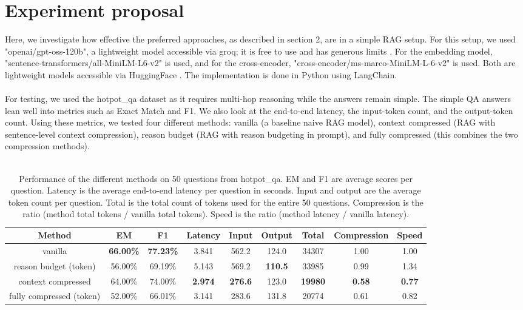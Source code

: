 \documentclass[pdflatex,sn-mathphys-num,oneside]{sn-jnl}%
\theoremstyle{thmstyleone}%
\theoremstyle{thmstyletwo}%
\theoremstyle{thmstylethree}%
\begin{document}
\section{Experiment proposal}\label{sec3}
Here, we investigate how effective the preferred approaches, as described in section 2, are in a simple RAG setup. 
For this setup, we used "openai/gpt-oss-120b", a lightweight model accessible via groq; it is free to use and has generous limits \cite{groq}. 
For the embedding model, "sentence-transformers/all-MiniLM-L6-v2" is used, and for the cross-encoder, "cross-encoder/ms-marco-MiniLM-L-6-v2" is used.
Both are lightweight models accessible via HuggingFace \cite{embedding} \cite{crossencoder}. The implementation is done in Python using LangChain.
\\ \\
For testing, we used the hotpot\_qa dataset as it requires multi-hop reasoning while the answers remain simple. 
The simple QA answers lean well into metrics such as Exact Match and F1.
We also look at the end-to-end latency, the input-token count, and the output-token count.
Using these metrics, we tested four different methods: vanilla (a baseline naive RAG model), context compressed (RAG with sentence-level context compression), reason budget (RAG with reason budgeting in prompt), and fully compressed (this combines the two compression methods).
\\ \\
\FloatBarrier

\begin{table}[htpb]
    \centering
    \begin{tabular}{||c || c | c | c | c|  c|  c|  c| c||}
        \hline 
        Method & EM & F1 & Latency & Input & Output & Total & Compression & Speed \\
        \hline \hline
        vanilla & \textbf{66.00\%} & \textbf{77.23\%} & 3.841 & 562.2 & 124.0 & 34307 & 1.00 & 1.00 \\
        \hline
        reason budget (token) & 56.00\% & 69.19\% & 5.143 & 569.2 & \textbf{110.5} & 33985 & 0.99 & 1.34 \\
        \hline
        context compressed  & 64.00\% & 74.00\% & \textbf{2.974} & \textbf{276.6} & 123.0 & \textbf{19980} & \textbf{0.58} & \textbf{0.77} \\
        \hline
        fully compressed (token) & 52.00\% & 66.01\% & 3.141 & 283.6 & 131.8 & 20774 & 0.61 & 0.82 \\
        \hline
    \end{tabular}
    \caption{Performance of the different methods on 50 questions from hotpot\_qa. 
    EM and F1 are average scores per question. Latency is the average end-to-end latency per question in seconds. 
    Input and output are the average token count per question. 
    Total is the total count of tokens used for the entire 50 questions.
    Compression is the ratio (method total tokens / vanilla total tokens).
    Speed is the ratio (method latency / vanilla latency).}
    \label{table:1}
\end{table}
\end{document}
